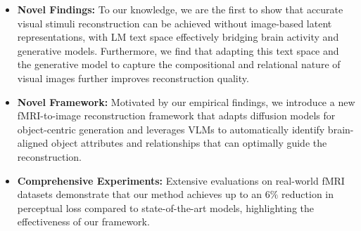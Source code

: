 \begin{itemize}[noitemsep,topsep=0pt]
    \item \textbf{Novel Findings:} To our knowledge, we are the first to show that accurate visual stimuli reconstruction can be achieved without image-based latent representations, with LM text space effectively bridging brain activity and generative models. Furthermore, we find that adapting this text space and the generative model to capture the compositional and relational nature of visual images further improves reconstruction quality.
    
    \item \textbf{Novel Framework:} 
    Motivated by our empirical findings, we introduce a new fMRI-to-image reconstruction framework that adapts diffusion models for object-centric generation and leverages VLMs to automatically identify brain-aligned object attributes and relationships that can optimally guide the reconstruction.
    \item \textbf{Comprehensive Experiments:} Extensive evaluations on real-world fMRI datasets demonstrate that our method achieves up to an $6\%$ reduction in perceptual loss compared to state-of-the-art models, highlighting the effectiveness of our framework.
\end{itemize}







